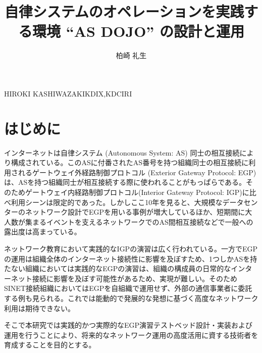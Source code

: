\documentclass[Japanese]{dicomopapers}
\begin{document}
\title{自律システムのオペレーションを実践する環境 ``AS DOJO'' の設計と運用}



\author{柏崎 礼生}{HIROKI KASHIWAZAKI}{KDIX,KDCIRI}

\maketitle

\section{はじめに}

インターネットは自律システム (Autonomous System: AS) 同士の相互接続により構成されている。このASに付番されたAS番号を持つ組織同士の相互接続に利用されるゲートウェイ外経路制御プロトコル (Exterior Gateway Protocol: EGP) は、ASを持つ組織同士が相互接続する際に使われることがもっぱらである。そのためゲートウェイ内経路制御プロトコル(Interior Gateway Protocol: IGP)に比べ利用シーンは限定的であった。しかしここ10年を見ると、大規模なデータセンターのネットワーク設計でEGPを用いる事例が増大しているほか、短期間に大人数が集まるイベントを支えるネットワークでのAS間相互接続などで一般への露出度は高まっている。


ネットワーク教育において実践的なIGPの演習は広く行われている。一方でEGPの運用は組織全体のインターネット接続性に影響を及ぼすため、1つしかASを持たない組織においては実践的なEGPの演習は、組織の構成員の日常的なインターネット接続に影響を及ぼす可能性があるため、実現が難しい。そのためSINET接続組織においてはEGPを自組織で運用せず、外部の通信事業者に委託する例も見られる。これでは能動的で発展的な発想に基づく高度なネットワーク利用は期待できない。

そこで本研究では実践的かつ実際的なEGP演習テストベッド設計・実装および運用を行うことにより、将来的なネットワーク運用の高度活用に資する技術者を育成することを目的とする。
\end{document}
